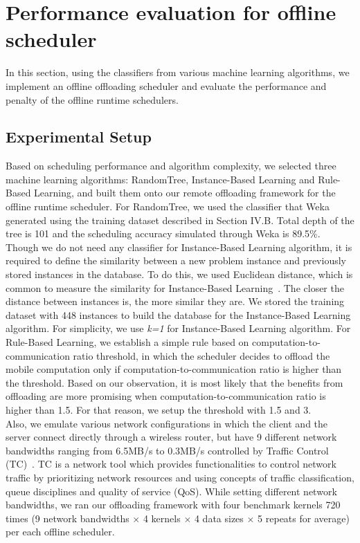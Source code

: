 \documentclass[10pt, conference, compsocconf]{IEEEtran}
\begin{document}
\section{Performance evaluation for offline scheduler}
%
In this section, using the classifiers from various machine learning
algorithms, we implement an offline offloading scheduler and evaluate
the performance and penalty of the offline runtime schedulers.
%
\subsection{Experimental Setup}
Based on scheduling performance and algorithm complexity, we selected
three machine learning algorithms: RandomTree, Instance-Based Learning
and Rule-Based Learning, and built them onto our remote offloading
framework for the offline runtime scheduler.
%
For RandomTree, we used the classifier that Weka generated using the
training dataset described in Section IV.B.
%
Total depth of the tree is 101 and the scheduling accuracy simulated
through Weka is 89.5\%.
%
Though we do not need any classifier for Instance-Based Learning
algorithm, it is required to define the similarity between a new problem
instance and previously stored instances in the database.
%
To do this, we used Euclidean distance, which is common to measure the
similarity for Instance-Based Learning~\cite{instance}.
%
The closer the distance between instances is, the more similar 
they are.
%
We stored the training dataset with 448 instances to build the
database for the Instance-Based Learning algorithm.
%
For simplicity, we use \textit{k=1} for Instance-Based Learning
algorithm.
%
For Rule-Based Learning, we establish a simple rule based on
computation-to-communication ratio threshold, in which the scheduler
decides to offload the mobile computation only if
computation-to-communication ratio is higher than the threshold.
%
Based on our observation, it is most likely that the benefits from
offloading are more promising when computation-to-communication ratio is
higher than 1.5.
%
For that reason, we setup the threshold with 1.5 and 3.\\
%
\indent Also, we emulate various network configurations in which the
client and the server connect directly through a wireless router, but
have 9 different network bandwidths ranging from 6.5MB/s to 0.3MB/s
controlled by Traffic Control (TC)~\cite{tc}.
%
TC is a network tool which provides functionalities to control network
traffic by prioritizing network resources and using concepts of traffic
classification, queue disciplines and quality of service (QoS).
%
While setting different network bandwidths, we ran
our offloading framework with four benchmark kernels 720 times (9
network bandwidths $\times$ 4 kernels $\times$ 4 data sizes $\times$ 5
repeats for average) per each offline scheduler.
%
\end{document}
